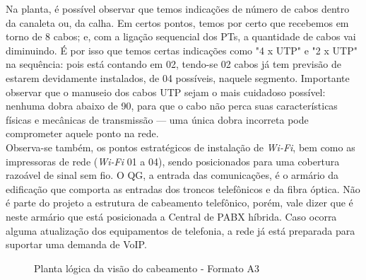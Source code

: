 \documentclass[	DIV=calc,%
							paper=a4,%
							fontsize=12pt,%
							onecolumn]{scrartcl}	 					%
\begin{document}
Na planta, é possível observar que temos indicações de número de cabos dentro da canaleta ou, da calha. Em certos pontos, temos por certo que recebemos em torno de 8 cabos; e, com a ligação sequencial dos PTs, a quantidade de cabos vai diminuindo. É por isso que temos certas indicações como "4 x UTP" e "2 x UTP" na sequência: pois está contando em 02, tendo-se 02 cabos já tem previsão de estarem devidamente instalados, de 04 possíveis, naquele segmento. Importante observar que o manuseio dos cabos UTP sejam o mais cuidadoso possível: nenhuma dobra abaixo de 90, para que o cabo não perca suas características físicas e mecânicas de transmissão --- uma única dobra incorreta pode comprometer aquele ponto na rede. 
\\

Observa-se também, os pontos estratégicos de instalação de \textit{Wi-Fi}, bem como as impressoras de rede (\textit{Wi-Fi} 01 a 04), sendo posicionados para uma cobertura razoável de sinal sem fio. O QG, a entrada das comunicações, é o armário da edificação que comporta as entradas dos troncos telefônicos e da fibra óptica. Não é parte do projeto a estrutura de cabeamento telefônico, porém, vale dizer que é neste armário que está posicionada a Central de PABX híbrida. Caso ocorra alguma atualização dos equipamentos de telefonia, a rede já está preparada para suportar uma demanda de VoIP. 


\clearpage
{}
\recalctypearea

\begin{figure}
	\noindent{}
	\caption{Planta lógica da visão do cabeamento - Formato A3}
	\label{fig1}
\end{figure}
\end{document}
